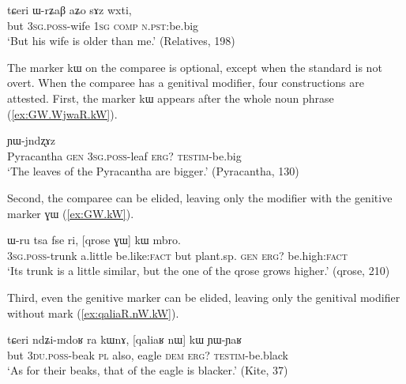 \documentclass[oldfontcommands,oneside,a4paper,11pt]{article}
\newcommand{\ipa}[1]{{\phon #1}} %
\begin{document}
\begin{exe}
\ex \label{ex:comp4}
\gll 
\ipa{tɕeri}  	\ipa{ɯ-rʑaβ}  	\ipa{aʑo}  	\ipa{sɤz}  	\ipa{wxti,}  \\
but \textsc{3sg.poss}-wife \textsc{1sg} \textsc{comp} \textsc{n.pst:}be.big \\
\glt `But his wife is older than me.' (Relatives, 198)
\end{exe}


The marker \ipa{kɯ} on the comparee is optional, except when the standard is not overt. When the comparee has a genitival modifier, four constructions are attested. First,  the marker \ipa{kɯ} appears after the whole noun phrase (\ref{ex:GW.WjwaR.kW}). 

\begin{exe}
\ex \label{ex:GW.WjwaR.kW}
\gll 
[\ipa{tɤru}  	\ipa{ɣɯ}  	\ipa{ɯ-jwaʁ}]  	\ipa{kɯ}  	\ipa{ɲɯ-jndʐɤz}  \\
Pyracantha \textsc{gen} \textsc{3sg.poss}-leaf \textsc{erg?} \textsc{testim}-be.big \\
\glt `The leaves of the Pyracantha are bigger.' (Pyracantha, 130)
 \end{exe}
 
Second,  the comparee can be elided, leaving only the modifier with the genitive marker \ipa{ɣɯ} (\ref{ex:GW.kW}).  

\begin{exe}
\ex \label{ex:GW.kW}
\gll 
\ipa{ɯ-ru}  	\ipa{tsa}  	\ipa{fse}  	\ipa{ri,}  	[\ipa{qrose}  	\ipa{ɣɯ}]  	\ipa{kɯ}  	\ipa{mbro.}  \\
\textsc{3sg.poss}-trunk a.little be.like:\textsc{fact} but plant.sp. \textsc{gen} \textsc{erg?} be.high:\textsc{fact} \\
\glt `Its  trunk is a little similar, but the one of the \ipa{qrose} grows higher.' (qrose, 210)
\end{exe}

Third, even the genitive marker can be elided, leaving only the genitival modifier without mark (\ref{ex:qaliaR.nW.kW}).

\begin{exe}
\ex \label{ex:qaliaR.nW.kW}
\gll 
\ipa{tɕeri}  	\ipa{ndʑi-mdoʁ}  	\ipa{ra}  	\ipa{kɯnɤ,}  	[\ipa{qaliaʁ}  	\ipa{nɯ}]  	\ipa{kɯ}  	\ipa{ɲɯ-ɲaʁ}  \\
but \textsc{3du.poss}-beak \textsc{pl} also, eagle \textsc{dem} \textsc{erg?} \textsc{testim}-be.black \\
\glt `As for their beaks, that of the eagle is blacker.' (Kite, 37)
\end{exe}
\end{document}
